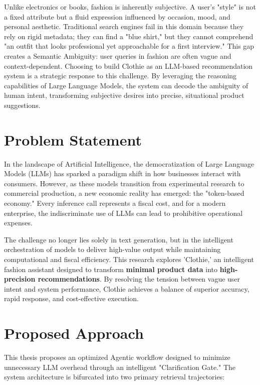 Unlike electronics or books, fashion is inherently subjective. A user’s "style" is not a fixed attribute but a fluid expression influenced by occasion, mood, and personal aesthetic. Traditional search engines fail in this domain because they rely on rigid metadata; they can find a "blue shirt," but they cannot comprehend "an outfit that looks professional yet approachable for a first interview."  This gap creates a Semantic Ambiguity: user queries in fashion are often vague and context-dependent. Choosing to build Clothie as an LLM-based recommendation system is a strategic response to this challenge. By leveraging the reasoning capabilities of Large Language Models, the system can decode the ambiguity of human intent, transforming subjective desires into precise, situational product suggestions.


\section{Problem Statement}
In the landscape of Artificial Intelligence, the democratization of Large Language Models (LLMs) has sparked a paradigm shift in how businesses interact with consumers. However, as these models transition from experimental research to commercial production, a new economic reality has emerged: the "token-based economy." Every inference call represents a fiscal cost, and for a modern enterprise, the indiscriminate use of LLMs can lead to prohibitive operational expenses. 

The challenge no longer lies solely in text generation, but in the intelligent orchestration of models to deliver high-value output while maintaining computational and fiscal efficiency. This research explores 'Clothie,' an intelligent fashion assistant designed to transform \textbf{minimal product data} into \textbf{high-precision recommendations}. By resolving the tension between vague user intent and system performance, Clothie achieves a balance of superior accuracy, rapid response, and cost-effective execution.

\section{Proposed Approach}

This thesis proposes an optimized Agentic workflow designed to minimize unnecessary LLM overhead through an intelligent "Clarification Gate." The system architecture is bifurcated into two primary retrieval trajectories:

